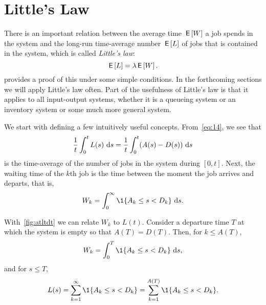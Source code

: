 \section{Little's Law}
\label{sec:littles-law}



There is an important relation between the average time $\,\mathsf{E}\left[W\right]$ a job
spends in the system and the long-run time-average number $\,\mathsf{E}\left[L\right]$ of jobs
that is contained in the system, which is called \emph{Little's law}:
\begin{equation}\label{eq:53}
  \,\mathsf{E}\left[L\right] = \lambda \,\mathsf{E}\left[W\right].
\end{equation}
 provides a proof of this under some simple conditions.
In the forthcoming sections we will apply Little's law often.
Part of the usefulness of Little's law is that it applies to all input-output systems, whether it is a queueing system or an inventory system or some much more general system.

We start with defining a few intuitively useful concepts.  From~\cref{eq:14},  we see that
\begin{equation*}
\frac 1 t\int_0^t L(s)\, \,\text{d}s =  \frac 1 t\int_0^t (A(s)-D(s)) \, \,\text{d}s
\end{equation*}
is the time-average of the number of jobs in the system during
$[0,t]$.
Next, the waiting time of the $k$th job is the time between the moment the
job arrives and departs, that is, 
\begin{equation*}
  W_k = \int_0^\infty \1{A_k \leq s < D_k}\,\d s.
\end{equation*}

With~\cref{fig:atltdt} we can relate $W_k$ to $L(t)$.
Consider a departure time $T$ at which the system is empty so that $A(T) = D(T)$.
Then, for $k\leq A(T)$, 
\begin{equation*}
  W_k = \int_0^T \1{A_k \leq s < D_k}\,\d s,
\end{equation*}
and for $s\leq T$,
\begin{equation*}
L(s) = \sum_{k=1}^\infty \1{A_k \leq s < D_k} = \sum_{k=1}^{A(T)}\1{A_k \leq s < D_k}.
\end{equation*}

